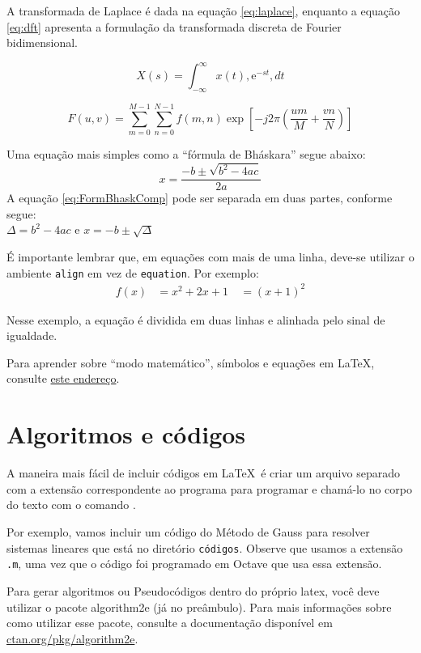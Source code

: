 A transformada de Laplace é dada na equação \ref{eq:laplace}, enquanto a equação \ref{eq:dft} apresenta a formulação da transformada discreta de Fourier bidimensional.

\begin{equation}
X(s) = \int_{-\infty}^{\infty} x(t) , \text{e}^{-st} , dt
\label{eq:laplace}
\end{equation}

\begin{equation}
F(u, v) = \sum_{m = 0}^{M - 1} \sum_{n = 0}^{N - 1} f(m, n) \exp \left[ -j 2 \pi \left( \frac{u m}{M} + \frac{v n}{N} \right) \right]
\label{eq:dft}
\end{equation}

Uma equação mais simples como a ``fórmula de Bháskara'' segue abaixo:
\begin{equation}
    x=\frac{-b\pm\sqrt{b^2-4ac}}{2a}\label{eq:FormBhaskComp}
\end{equation}
A equação \eqref{eq:FormBhaskComp} pode ser separada em duas partes, conforme segue:\\
$\Delta=b^2-4ac$ e $x=-b\pm\sqrt{\Delta}$

É importante lembrar que, em equações com mais de uma linha, deve-se utilizar o ambiente \texttt{align} em vez de \texttt{equation}. Por exemplo:
\begin{align}
f(x) &= x^2 + 2x + 1 \
&= (x+1)^2
\end{align}

Nesse exemplo, a equação é dividida em duas linhas e alinhada pelo sinal de igualdade. 

Para aprender sobre ``modo matemático'', símbolos e equações em \LaTeX, consulte \href{https://pt.overleaf.com/learn/latex/Mathematical_expressions}{este endereço}.

\section{Algoritmos e códigos}
A maneira mais fácil de incluir códigos em \LaTeX~é criar um arquivo separado com a extensão correspondente ao programa para programar e  chamá-lo no corpo do texto com o comando \verb||.

Por exemplo, vamos incluir um código do Método de Gauss para resolver sistemas lineares que está no diretório \verb|códigos|. Observe que usamos a extensão \verb|.m|, uma vez que o código foi programado em Octave que usa essa extensão.


Para gerar algoritmos ou Pseudocódigos dentro do próprio latex, você deve utilizar o pacote {\ttfamily algorithm2e} (já no preâmbulo). Para mais informações sobre como utilizar esse pacote, consulte a documentação disponível em \href{https://www.ctan.org/pkg/algorithm2e}{ctan.org/pkg/algorithm2e}.
